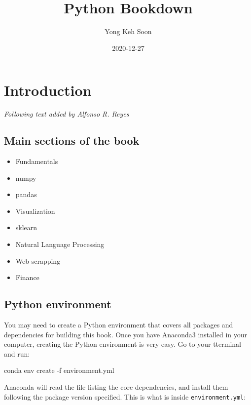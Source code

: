 \documentclass[
]{book}
\title{Python Bookdown}
\author{Yong Keh Soon}
\date{2020-12-27}
\newenvironment{Shaded}{\begin{snugshade}}{\end{snugshade}}
\newcommand{\ExtensionTok}[1]{#1}
\newcommand{\NormalTok}[1]{#1}
\providecommand{\tightlist}{%
  \setlength{\itemsep}{0pt}\setlength{\parskip}{0pt}}
\begin{document}
\maketitle

{
\hypersetup{linkcolor=}
\setcounter{tocdepth}{2}
\tableofcontents
}
\hypertarget{introduction}{%
\chapter*{Introduction}\label{introduction}}


\emph{Following text added by Alfonso R. Reyes}

\hypertarget{main-sections-of-the-book}{%
\section*{Main sections of the book}\label{main-sections-of-the-book}}


\begin{itemize}
\tightlist
\item
  Fundamentals
\item
  numpy
\item
  pandas
\item
  Visualization
\item
  sklearn
\item
  Natural Language Processing
\item
  Web scrapping
\item
  Finance
\end{itemize}

\hypertarget{python-environment}{%
\section*{Python environment}\label{python-environment}}


You may need to create a Python environment that covers all packages and dependencies for building this book. Once you have Anaconda3 installed in your computer, creating the Python environment is very easy. Go to your tterminal and run:

\begin{Shaded}
\begin{Highlighting}[]
\ExtensionTok{conda}\NormalTok{ env create {-}f environment.yml}
\end{Highlighting}
\end{Shaded}

Anaconda will read the file listing the core dependencies, and install them following the package version specified. This is what is inside \texttt{environment.yml}:
\end{document}
